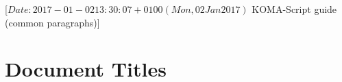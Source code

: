 %
%
%
%
%
%
%
%
% 
%
%
%
%

                 [$Date: 2017-01-02 13:30:07 +0100 (Mon, 02 Jan 2017) $
                  KOMA-Script guide (common paragraphs)]



\section{Document Titles}
%
\BeginIndexGroup
{}%
%

